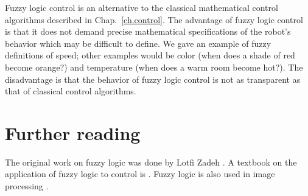 Fuzzy logic control is an alternative to the classical mathematical control algorithms described in Chap.~\ref{ch.control}. The advantage of fuzzy logic control is that it does not demand precise mathematical specifications of the robot's behavior which may be difficult to define. We gave an example of fuzzy definitions of speed; other examples would be color (when does a shade of red become orange?) and temperature (when does a warm room become hot?). The disadvantage is that the behavior of fuzzy logic control is not as transparent as that of classical control algorithms.

\section{Further reading}

The original work on fuzzy logic was done by Lotfi Zadeh \cite{zadeh}. A textbook on the application of fuzzy logic to control is \cite{passino}.  Fuzzy logic is also used in image processing \cite[Sect.~3.8]{GW}.



